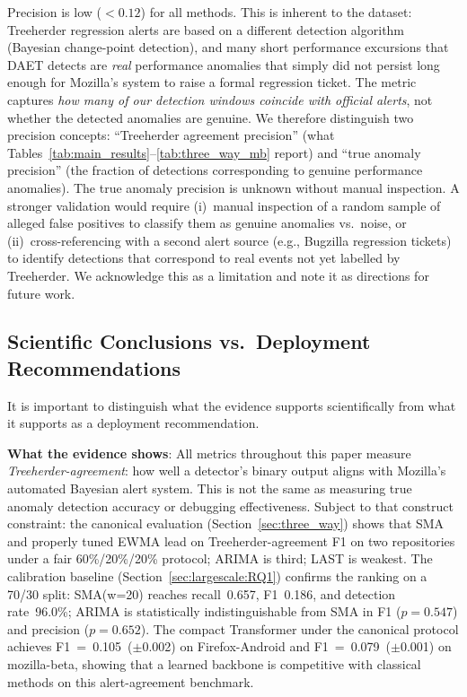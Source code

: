 \documentclass[pdflatex,sn-nature]{sn-jnl}
\theoremstyle{thmstyleone}%
\begin{document}
Precision is low ($<0.12$) for all methods.
This is inherent to the dataset: Treeherder regression alerts are based on
a different detection algorithm (Bayesian change-point detection), and many
short performance excursions that DAET detects are \emph{real} performance
anomalies that simply did not persist long enough for Mozilla's system to
raise a formal regression ticket.
The metric captures \emph{how many of our detection windows coincide with
official alerts}, not whether the detected anomalies are genuine.
We therefore distinguish two precision concepts: ``Treeherder agreement
precision'' (what Tables~\ref{tab:main_results}--\ref{tab:three_way_mb}
report) and ``true anomaly precision'' (the fraction of detections
corresponding to genuine performance anomalies).
The true anomaly precision is unknown without manual inspection.
A stronger validation would require (i)~manual inspection of a random sample
of alleged false positives to classify them as genuine anomalies vs.~noise,
or (ii)~cross-referencing with a second alert source (e.g., Bugzilla regression
tickets) to identify detections that correspond to real events not yet labelled
by Treeherder.
We acknowledge this as a limitation and note it as directions for future work.

\subsection{Scientific Conclusions vs.\ Deployment Recommendations}

It is important to distinguish what the evidence supports scientifically
from what it supports as a deployment recommendation.

\textbf{What the evidence shows}:
All metrics throughout this paper measure \emph{Treeherder-agreement}:
how well a detector's binary output aligns with Mozilla's automated Bayesian
alert system.
This is not the same as measuring true anomaly detection accuracy or
debugging effectiveness.
Subject to that construct constraint:
the canonical evaluation (Section~\ref{sec:three_way}) shows that SMA and
properly tuned EWMA lead on Treeherder-agreement F1 on two repositories
under a fair 60\%/20\%/20\% protocol; ARIMA is third; LAST is weakest.
The calibration baseline (Section~\ref{sec:largescale:RQ1}) confirms the
ranking on a 70/30 split: SMA(w=20) reaches recall~0.657, F1~0.186, and
detection rate~96.0\%; ARIMA is statistically indistinguishable from SMA
in F1 ($p=0.547$) and precision ($p=0.652$).
The compact Transformer under the canonical protocol achieves
F1~=~0.105~($\pm$0.002) on Firefox-Android and F1~=~0.079~($\pm$0.001) on
mozilla-beta, showing that a learned backbone is competitive with classical
methods on this alert-agreement benchmark.
\end{document}
